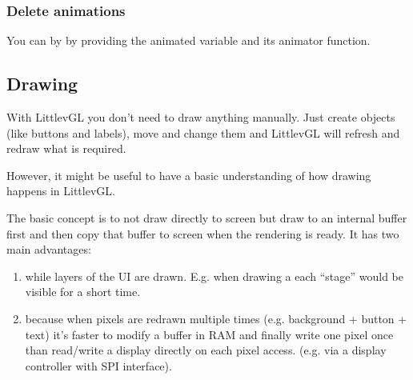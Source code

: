 \documentclass[letterpaper,10pt,english]{sphinxmanual}
\begin{document}
\subsubsection{Delete animations}
\label{\detokenize{overview/animations:delete-animations}}
You can  by  by providing the animated variable and its animator function.


\subsection{Drawing}
\label{\detokenize{overview/drawing:drawing}}\label{\detokenize{overview/drawing::doc}}
With LittlevGL you don’t need to draw anything manually. Just create objects (like buttons and labels), move and change them and LittlevGL will refresh and redraw what is required.

However, it might be useful to have a basic understanding of how drawing happens in LittlevGL.

The basic concept is to not draw directly to screen but draw to an internal buffer first and then copy that buffer to screen when the rendering is ready. It has two main advantages:
\begin{enumerate}
\def\theenumi{\arabic{enumi}}
\def\labelenumi{\theenumi .}
\makeatletter\def\p@enumii{\p@enumi \theenumi .}\makeatother
\item {} 
 while layers of the UI are drawn. E.g. when drawing a  each “stage” would be visible for a short time.

\item {} 
 because when pixels are redrawn multiple times (e.g. background + button + text) it’s faster to modify a buffer in RAM and finally write one pixel once
than read/write a display directly on each pixel access. (e.g. via a display controller with SPI interface).

\end{enumerate}
\end{document}

